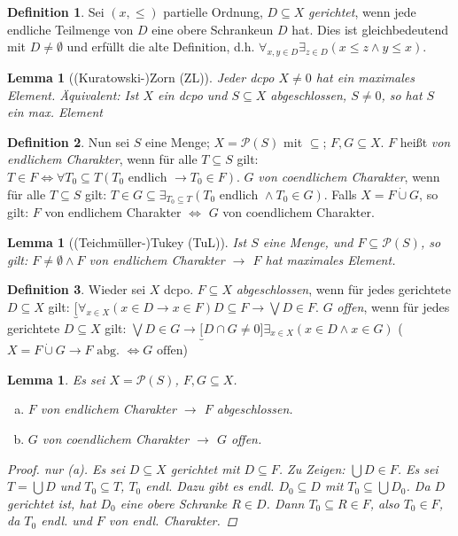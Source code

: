 \documentclass[headsepline=true,DIV=11]{scrartcl}
\newtheorem{lemma}[theorem]{Lemma}
\theoremstyle{definition}
\newtheorem*{definition}{Definition}
\begin{document}

\begin{definition}
	Sei $(x,\le)$ partielle Ordnung, $D\subseteq X$ {\em gerichtet}, wenn jede endliche Teilmenge von $D$ eine obere Schrankeun $D$ hat.
	Dies ist gleichbedeutend mit $D\neq\emptyset$ und erfüllt die alte Definition, d.h. $\forall_{x,y\in D}\exists_{z\in D}(x\le z \land y\le x)$.
\end{definition}

\begin{lemma}[(Kuratowski-)Zorn (ZL)]
	Jeder dcpo $X\neq 0$ hat ein maximales Element.
	Äquivalent: Ist $X$ ein dcpo und $S\subseteq X$ abgeschlossen, $S\neq 0$, so hat $S$ ein max. Element
\end{lemma}

\begin{definition}
	Nun sei $S$ eine Menge; $X=\mathcal P(S)$ mit $\subseteq$; $F,G\subseteq X$.
	$F$ heißt {\em von endlichem Charakter}, wenn für alle $T\subseteq S$ gilt: $T\in F\iff \forall T_0\subseteq T(T_0 \text{ endlich } \to T_0\in F)$.
	$G$ {\em von coendlichem Charakter}, wenn für alle $T\subseteq S$ gilt: $T\in G\subseteq \exists_{T_0\subseteq T}(T_0 \text{ endlich } \land T_0\in G)$.
	Falls $X=F\dot\cup G$, so gilt: $F$ von endlichem Charakter $\iff$ $G$ von coendlichem Charakter.
\end{definition}

\begin{lemma}[(Teichmüller-)Tukey (TuL)]
	Ist $S$ eine Menge, und $F\subseteq\mathcal P(S)$, so gilt: $F\neq\emptyset \land F$ von endlichem Charakter $\to$ $F$ hat maximales Element.
\end{lemma}

\begin{definition}
	Wieder sei $X$ dcpo. 
	$F\subseteq X$ {\em abgeschlossen}, wenn für jedes gerichtete $D\subseteq X$ gilt: 
	$\underbrace[\forall_{x\in X}(x\in D\to x\in F){D\subseteq F}\to \bigvee D\in F$.
	$G$ {\em offen}, wenn für jedes gerichtete $D\subseteq X$ gilt: 
	$\bigvee D\in G\to \underbrace[D\cap G\neq 0]{\exists_{x\in X}(x\in D \land x\in G)}$
	($X=F\dot\cup G\to F \text{ abg. } \iff G \text{ offen}$)
\end{definition}

\begin{lemma}
	Es sei $X=\mathcal P(S)$, $F,G\subseteq X$.
	\begin{enumerate}[(a)]
		\item $F$ von endlichem Charakter $\to$ $F$ abgeschlossen.
		\item $G$ von coendlichem Charakter $\to$ $G$ offen.
	\end{enumerate}
	\begin{proof}
		nur (a). Es sei $D\subseteq X$ gerichtet mit $D\subseteq F$.
		Zu Zeigen: $\bigcup D\in F$. 
		Es sei $T=\bigcup D$ und $T_0\subseteq T$, $T_0$ endl.
		Dazu gibt es endl. $D_0\subseteq D$ mit $T_0\subseteq\bigcup D_0$.
		Da $D$ gerichtet ist, hat $D_0$ eine obere Schranke $R\in D$.
		Dann $T_0\subseteq R\in F$, also $T_0\in F$, da $T_0$ endl. und $F$ von endl. Charakter.
	\end{proof}
\end{lemma}
\end{document}
